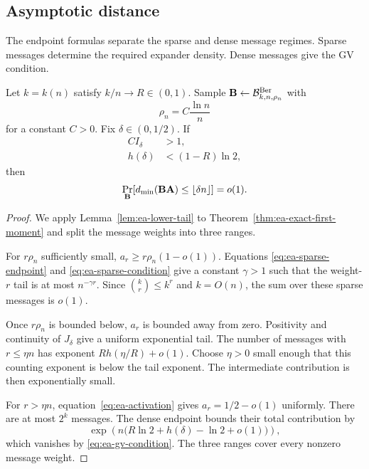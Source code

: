 \subsection{Asymptotic distance}

The endpoint formulas separate the sparse and dense message regimes.  Sparse
messages determine the required expander density.  Dense messages give the GV
condition.

\begin{theorem}
\label{thm:ea-distance}
Let $k=k(n)$ satisfy $k/n\to R\in(0,1)$.  Sample
$\mathbf B\gets\mathcal B^{\mathrm{Ber}}_{k,n,\rho_n}$ with
\begin{equation}
 \rho_n=C\frac{\ln n}{n}
 \label{eq:ea-density}
\end{equation}
for a constant $C>0$.  Fix $\delta\in(0,1/2)$.  If
\begin{align}
 C I_\delta&>1,
 \label{eq:ea-sparse-condition}\\
 h(\delta)&<(1-R)\ln2,
 \label{eq:ea-gv-condition}
\end{align}
then
\begin{equation}
 \Pr_{\mathbf B}\!\left[d_{\min}(\mathbf B\mathbf A)\leq\lfloor\delta n\rfloor\right]
 =o(1).
 \label{eq:ea-distance-conclusion}
\end{equation}
\end{theorem}

\begin{proof}
We apply Lemma~\ref{lem:ea-lower-tail} to
Theorem~\ref{thm:ea-exact-first-moment} and split the message weights into
three ranges.

For $r\rho_n$ sufficiently small,
$a_r\geq r\rho_n(1-o(1))$.  Equations
\eqref{eq:ea-sparse-endpoint} and \eqref{eq:ea-sparse-condition} give a
constant $\gamma>1$ such that the weight-$r$ tail is at most
$n^{-\gamma r}$.  Since $\binom{k}{r}\leq k^r$ and $k=O(n)$, the sum over
these sparse messages is $o(1)$.

Once $r\rho_n$ is bounded below, $a_r$ is bounded away from zero.  Positivity
and continuity of $J_\delta$ give a uniform exponential tail.  The number of
messages with $r\leq\eta n$ has exponent
$R h(\eta/R)+o(1)$.  Choose $\eta>0$ small enough that this counting exponent
is below the tail exponent.  The intermediate contribution is then
exponentially small.

For $r>\eta n$, equation~\eqref{eq:ea-activation} gives
$a_r=1/2-o(1)$ uniformly.  There are at most $2^k$ messages.  The dense
endpoint bounds their total contribution by
\[
 \exp\!\left(n\bigl(R\ln2+h(\delta)-\ln2+o(1)\bigr)\right),
\]
which vanishes by \eqref{eq:ea-gv-condition}.  The three ranges cover every
nonzero message weight.
\end{proof}

